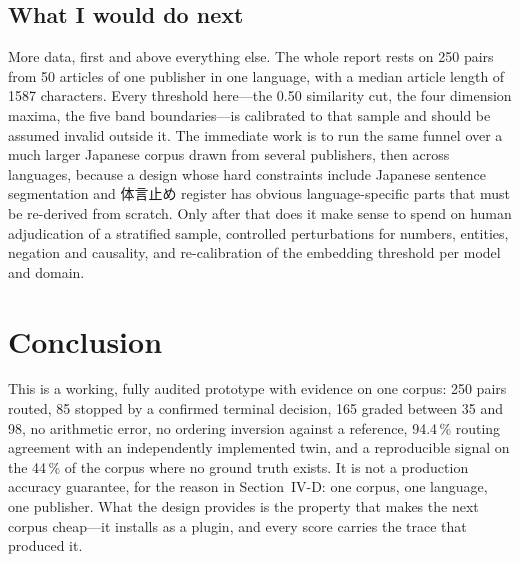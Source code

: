 \documentclass[conference]{IEEEtran}
\begin{document}
\subsection{What I would do next}
More data, first and above everything else. The whole report rests on
250 pairs from 50 articles of one publisher in one language, with a
median article length of 1587 characters. Every threshold here---the
0.50 similarity cut, the four dimension maxima, the five band
boundaries---is calibrated to that sample and should be assumed invalid
outside it. The immediate work is to run the same funnel over a much
larger Japanese corpus drawn from several publishers, then across
languages, because a design whose hard constraints include Japanese
sentence segmentation and \mbox{体言止め} register has obvious
language-specific parts that must be re-derived from scratch.
Only after that does it make sense to spend on human adjudication of a
stratified sample, controlled perturbations for numbers, entities,
negation and causality, and re-calibration of the embedding threshold
per model and domain.

\section{Conclusion}
This is a working, fully audited prototype with evidence on one corpus:
250 pairs routed, 85 stopped by a confirmed terminal decision, 165
graded between 35 and 98, no arithmetic error, no ordering inversion
against a reference, 94.4\,\% routing agreement with an independently
implemented twin, and a reproducible signal on the 44\,\% of the corpus
where no ground truth exists. It is not a production accuracy guarantee,
for the reason in Section~IV-D: one corpus, one language, one publisher.
What the design provides is the property that makes the next corpus
cheap---it installs as a plugin, and every score carries the trace that
produced it.

\balance
\end{document}
